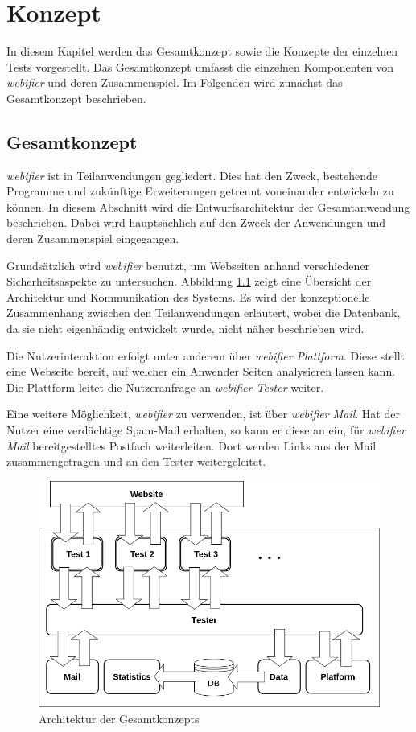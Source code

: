 \chapter{Konzept}

In diesem Kapitel werden das Gesamtkonzept sowie die Konzepte der einzelnen Tests vorgestellt. Das
Gesamtkonzept umfasst die einzelnen Komponenten von \textit{webifier} und deren Zusammenspiel. Im
Folgenden wird zunächst das Gesamtkonzept beschrieben.

\section{Gesamtkonzept}

\textit{webifier} ist in Teilanwendungen gegliedert.
Dies hat den Zweck, bestehende Programme und zukünftige Erweiterungen getrennt
voneinander entwickeln zu können. In diesem Abschnitt wird die Entwurfsarchitektur der
Gesamtanwendung beschrieben. Dabei wird hauptsächlich auf den Zweck der Anwendungen und deren
Zusammenspiel eingegangen.

Grundsätzlich wird \textit{webifier} benutzt, um Webseiten anhand verschiedener Sicherheitsaspekte
zu untersuchen.
Abbildung \ref{fig:anwendung-konzept} zeigt eine Übersicht der Architektur und
Kommunikation des Systems.
Es wird der konzeptionelle Zusammenhang zwischen den Teilanwendungen erläutert, wobei die
Datenbank, da sie nicht eigenhändig entwickelt wurde, nicht näher beschrieben
wird.

Die Nutzerinteraktion erfolgt unter anderem über \textit{webifier Plattform}. Diese stellt eine
Webseite bereit, auf welcher ein Anwender Seiten analysieren lassen kann. Die Plattform leitet die
Nutzeranfrage an \textit{webifier Tester} weiter.

Eine weitere Möglichkeit, \textit{webifier} zu verwenden, ist über \textit{webifier Mail}.
Hat der Nutzer eine verdächtige Spam-Mail erhalten, so kann er diese an ein, für \textit{webifier
Mail} bereitgestelltes Postfach weiterleiten.
Dort werden Links aus der Mail zusammengetragen und an den Tester weitergeleitet.

\begin{figure}[H]
	\centering
	\includegraphics[width=14cm]{images/anwendung-konzept}
	\caption{Architektur der Gesamtkonzepts}
	\label{fig:anwendung-konzept}
\end{figure}

